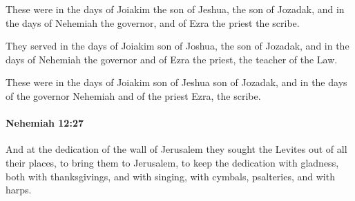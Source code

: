 			\begin{versebox}
					\item[BHS] 
					\item[LXX] 
					\item[ASV] These were in the days of Joiakim the son of Jeshua, the son of Jozadak, and in the days of Nehemiah the governor, and of Ezra the priest the scribe.
					\item[NIV] They served in the days of Joiakim son of Joshua, the son of Jozadak, and in the days of Nehemiah the governor and of Ezra the priest, the teacher of the Law.
					\item[NRSV] These were in the days of Joiakim son of Jeshua son of Jozadak, and in the days of the governor Nehemiah and of the priest Ezra, the scribe.
			\end{versebox}

		\paragraph{Nehemiah 12:27} %
			\label{NEHEMIAH-12-27}

			And at the dedication of the wall of Jerusalem they sought the Levites out of all their places, to bring them to Jerusalem, to keep the dedication with gladness, both with thanksgivings, and with singing, with cymbals, psalteries, and with harps.

